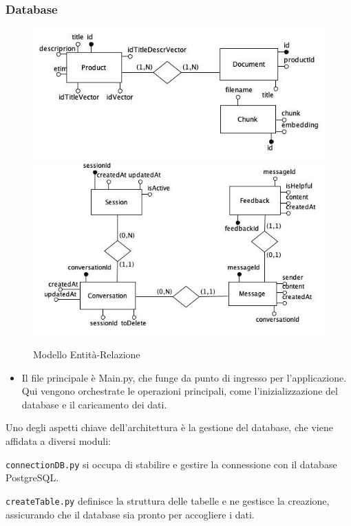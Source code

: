 \subsubsection{Database}
\begin{figure}[H]
    \centering
    \includegraphics[width=\textwidth]{images/productER.er.jpg}
    \includegraphics[width=\textwidth]{images/MessagesER.er.jpg}
    \caption{Modello Entit\`a-Relazione}
    \label{fig:Diagramma ER}
\end{figure}

\begin{itemize}
\item Il file principale è \texttt{}{Main.py}, che funge da punto di ingresso per l'applicazione. Qui vengono orchestrate le operazioni principali, come l'inizializzazione del database e il caricamento dei dati.
\end{itemize}
Uno degli aspetti chiave dell'architettura è la gestione del database, che viene affidata a diversi moduli:

\texttt{connectionDB.py} si occupa di stabilire e gestire la connessione con il database PostgreSQL.

\texttt{createTable.py} definisce la struttura delle tabelle e ne gestisce la creazione, assicurando che il database sia pronto per accogliere i dati.

